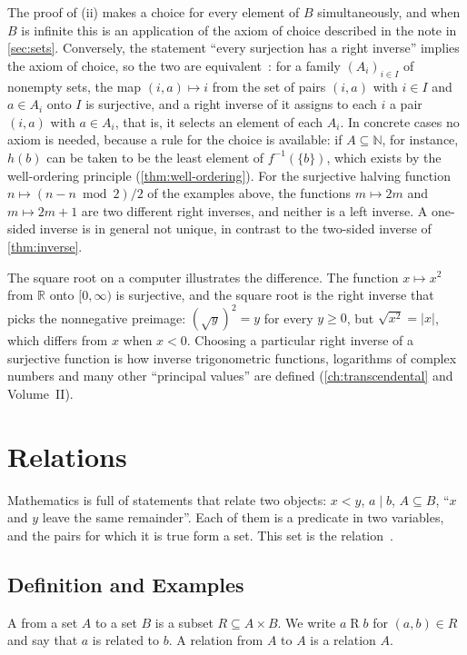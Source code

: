 The proof of (ii) makes a choice for every element of $B$ simultaneously, and when $B$ is infinite this is an application of the axiom of choice described in the note in \cref{sec:sets}. Conversely, the statement ``every surjection has a right inverse'' implies the axiom of choice, so the two are equivalent~\cite{bell2021choice}: for a family $(A_i)_{i\in I}$ of nonempty sets, the map $(i,a)\mapsto i$ from the set of pairs $(i,a)$ with $i\in I$ and $a\in A_i$ onto $I$ is surjective, and a right inverse of it assigns to each $i$ a pair $(i,a)$ with $a\in A_i$, that is, it selects an element of each $A_i$. In concrete cases no axiom is needed, because a rule for the choice is available: if $A\subseteq\mathbb N$, for instance, $h(b)$ can be taken to be the least element of $f^{-1}(\{b\})$, which exists by the well-ordering principle (\cref{thm:well-ordering}). For the surjective halving function $n\mapsto(n-n\bmod2)/2$ of the examples above, the functions $m\mapsto2m$ and $m\mapsto2m+1$ are two different right inverses, and neither is a left inverse. A one-sided inverse is in general not unique, in contrast to the two-sided inverse of \cref{thm:inverse}.

The square root on a computer illustrates the difference. The function $x\mapsto x^2$ from $\mathbb R$ onto $[0,\infty)$ is surjective, and the square root is the right inverse that picks the nonnegative preimage: $(\sqrt y)^2=y$ for every $y\ge0$, but $\sqrt{x^2}=|x|$, which differs from $x$ when $x<0$. Choosing a particular right inverse of a surjective function is how inverse trigonometric functions, logarithms of complex numbers and many other ``principal values'' are defined (\cref{ch:transcendental} and Volume~II).

\section{Relations}
\label{sec:relations}

Mathematics is full of statements that relate two objects: $x<y$, $a\mid b$, $A\subseteq B$, ``$x$ and $y$ leave the same remainder''. Each of them is a predicate in two variables, and the pairs for which it is true form a set. This set is the relation~\cite{enderton1977sets}.

\subsection{Definition and Examples}

\begin{definition}[Relation]
\label{def:relation}
A  from a set $A$ to a set $B$ is a subset $R\subseteq A\times B$. We write $a\mathrel{R}b$ for $(a,b)\in R$ and say that $a$ is related to $b$. A relation from $A$ to $A$ is a relation  $A$.
\end{definition}

